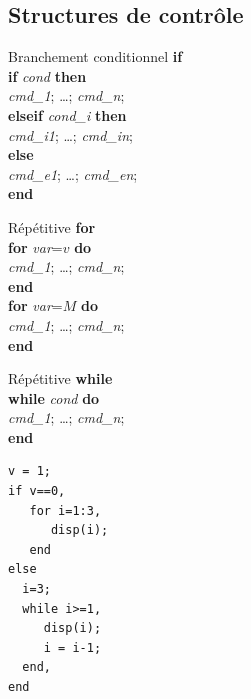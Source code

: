 \documentclass{article}
\begin{document}
\begin{multicols}{3}
\subsection{Structures de contrôle}
\label{controle}
\begin{description}
\item{Branchement conditionnel \textbf{if}}\\

\vspace{-3mm}
\hspace*{-7mm}\textbf{if} \textit{cond} \textbf{then}\\
\textit{cmd\_1}; \ldots; \textit{cmd\_n};\\
\hspace*{-7mm}\textbf{elseif} \textit{cond\_i} \textbf{then}\\
\textit{cmd\_i1}; \ldots; \textit{cmd\_in};\\
\hspace*{-7mm}\textbf{else}\\
\textit{cmd\_e1}; \ldots; \textit{cmd\_en};\\
\hspace*{-7mm}\textbf{end}\\

\item{Répétitive \textbf{for}}\\

\vspace{-3mm}
\hspace*{-7mm}\textbf{for} \textit{var}=$v$ \textbf{do}\\
\textit{cmd\_1}; \ldots; \textit{cmd\_n};\\
\hspace*{-7mm}\textbf{end}\\

\vspace{-3mm}
\hspace*{-7mm}\textbf{for} \textit{var}=$M$ \textbf{do}\\
\textit{cmd\_1}; \ldots; \textit{cmd\_n};\\
\hspace*{-7mm}\textbf{end}\\

\item{Répétitive \textbf{while}}\\

\vspace{-3mm}
\hspace*{-7mm}\textbf{while} \textit{cond} \textbf{do}\\
\textit{cmd\_1}; \ldots; \textit{cmd\_n};\\
\hspace*{-7mm}\textbf{end}
\end{description}
\label{excontrole}
\begin{verbatim}
v = 1;
if v==0,
   for i=1:3,
      disp(i);
   end
else
  i=3;
  while i>=1,
     disp(i);
     i = i-1;
  end, 
end    
\end{verbatim}

\end{multicols}
\end{document}
